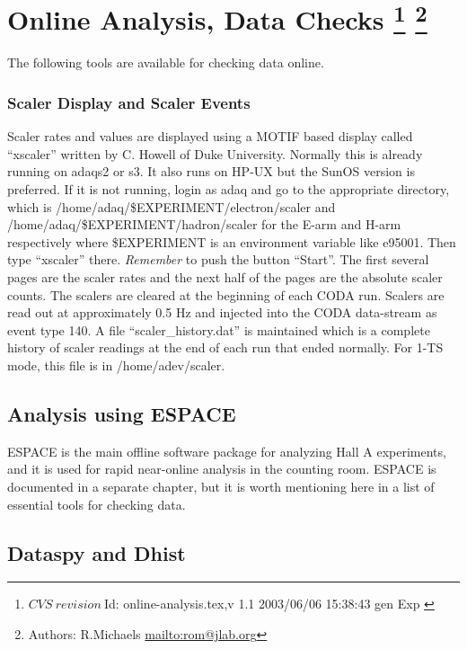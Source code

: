 \section[Online Analysis, Data Checks]{Online Analysis, Data Checks
\footnote{
  $CVS~revision~ $Id: online-analysis.tex,v 1.1 2003/06/06 15:38:43 gen Exp $ $
}
\footnote{Authors: R.Michaels \url{mailto:rom@jlab.org}}
}
 
\par
The following tools are available for checking
data online.


\subsubsection{Scaler Display and Scaler Events}
Scaler rates and values are displayed using
a MOTIF based display called ``xscaler''
written by C. Howell of Duke University.
Normally this is already running on adaqs2 or s3.
It also runs on HP-UX but the SunOS version
is preferred.  If it is not running, login as
adaq and go to the appropriate directory,
which is 
/home/adaq/\$EXPERIMENT/electron/scaler
and
/home/adaq/\$EXPERIMENT/hadron/scaler
for the E-arm and H-arm respectively
where \$EXPERIMENT is an environment
variable like e95001.
Then type ``xscaler'' there.  
{\it Remember} to push the button ``Start''.
The first several pages are the scaler rates and
the next half of the pages are the absolute
scaler counts.  The scalers are cleared at
the beginning of each CODA run.
Scalers are read out at approximately 0.5 Hz 
and injected into the CODA data-stream 
as event type 140.  A file
``scaler\_history.dat'' is maintained which is
a complete history of scaler readings at
the end of each run that ended normally.
For 1-TS mode, this file is in /home/adev/scaler.

\subsection{Analysis using ESPACE}

ESPACE is the main offline software package
for analyzing Hall A experiments, and it is
used for rapid near-online analysis in the
counting room.  ESPACE is
documented in a separate chapter, 
but it is worth mentioning here in a list of
essential tools for checking data.

\subsection{Dataspy and Dhist} 

